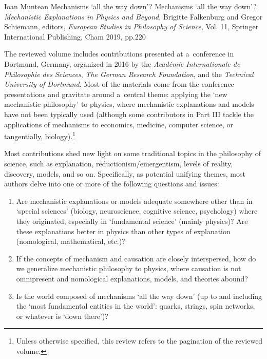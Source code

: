 \begin{recengenv}{Ioan Muntean}
	{Mechanisms ‘all the way down'?}
	{Mechanisms ‘all the way down'?}
	{\textit{Mechanistic Explanations in Physics and Beyond}, Brigitte Falkenburg and Gregor Schiemann, editors, \textit{European Studies in Philosophy of Science}, Vol. 11, Springer International Publishing, Cham 2019, pp.220}
	


\noindent The reviewed volume includes contributions presented at a~conference in Dortmund, Germany, organized in 2016 by the \textit{Académie Internationale de Philosophie des Sciences}, \textit{The German Research Foundation}, and the \textit{Technical University of Dortmund}. Most of the materials come from the conference presentations and gravitate around a~central theme: applying the ‘new mechanistic philosophy' to physics, where mechanistic explanations and models have not been typically used (although some contributors in Part III tackle the applications of mechanisms to economics, medicine, computer science, or tangentially, biology).\footnote{Unless otherwise specified, this review refers to the pagination of the reviewed
\parencite[][]{falkenburg_mechanistic_2019} %
 volume.}

Most contributions shed new light on some traditional topics in the philosophy of science, such as explanation, reductionism/emergentism, levels of reality, discovery, models, and so on. Specifically, as potential unifying themes, most authors delve into one or more of the following questions and issues:

\begin{enumerate}[label={(\arabic*)}]
\item Are mechanistic explanations or models adequate somewhere other than in ‘special sciences' (biology, neuroscience, cognitive science, psychology) where they originated, especially in ‘fundamental science' (mainly physics)? Are these explanations better in physics than other types of explanation (nomological, mathematical, etc.)?

\item If the concepts of mechanism and causation are closely interspersed, how do we generalize mechanistic philosophy to physics, where causation is not omnipresent and nomological explanations, models, and theories abound?

\item Is the world composed of mechanisms ‘all the way down' (up to and including the ‘most fundamental entities in the world': quarks, strings, spin networks, or whatever is ‘down there')?


\end{enumerate}
\end{recengenv}
